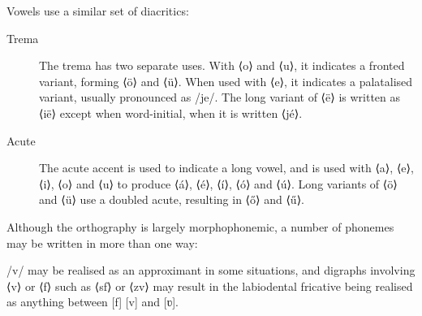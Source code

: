 \documentclass[grammar]{subfiles}
\begin{document}
  \pagebreak[2]
  Vowels use a similar set of diacritics:

  \begin{description}
    \item[Trema] The trema has two separate uses.  With ⟨o⟩ and ⟨u⟩, it indicates a fronted variant, forming ⟨ö⟩ and ⟨ü⟩.  When used with ⟨e⟩, it indicates a palatalised variant, usually pronounced as /je/.  The long variant of ⟨ë⟩ is written as ⟨ië⟩ except when word-initial, when it is written ⟨jé⟩. 


    \item[Acute] The acute accent is used to indicate a long vowel, and is used with ⟨a⟩, ⟨e⟩, ⟨i⟩, ⟨o⟩ and ⟨u⟩ to produce ⟨á⟩, ⟨é⟩, ⟨í⟩, ⟨ó⟩ and ⟨ú⟩.  Long variants of ⟨ö⟩ and ⟨ü⟩ use a doubled acute, resulting in ⟨ő⟩ and ⟨ű⟩. 
  \end{description}

  Although the orthography is largely morphophonemic, a number of phonemes may be written in more than one way:

  \begin{itemize*}
    \item /v/ may be realised as an approximant in some situations, and digraphs involving ⟨v⟩ or ⟨f⟩ such as ⟨sf⟩ or ⟨zv⟩ may result in the labiodental fricative being realised as anything between [f] [v] and [ʋ].
  \end{itemize*}
\end{document}

